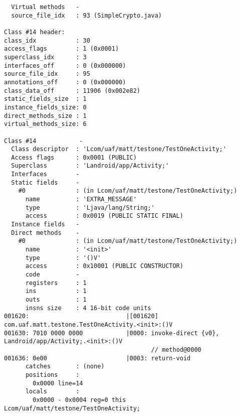\begin{lstlisting}
  Virtual methods   -
  source_file_idx   : 93 (SimpleCrypto.java)

Class #14 header:
class_idx           : 30
access_flags        : 1 (0x0001)
superclass_idx      : 3
interfaces_off      : 0 (0x000000)
source_file_idx     : 95
annotations_off     : 0 (0x000000)
class_data_off      : 11906 (0x002e82)
static_fields_size  : 1
instance_fields_size: 0
direct_methods_size : 1
virtual_methods_size: 6

Class #14            -
  Class descriptor  : 'Lcom/uaf/matt/testone/TestOneActivity;'
  Access flags      : 0x0001 (PUBLIC)
  Superclass        : 'Landroid/app/Activity;'
  Interfaces        -
  Static fields     -
    #0              : (in Lcom/uaf/matt/testone/TestOneActivity;)
      name          : 'EXTRA_MESSAGE'
      type          : 'Ljava/lang/String;'
      access        : 0x0019 (PUBLIC STATIC FINAL)
  Instance fields   -
  Direct methods    -
    #0              : (in Lcom/uaf/matt/testone/TestOneActivity;)
      name          : '<init>'
      type          : '()V'
      access        : 0x10001 (PUBLIC CONSTRUCTOR)
      code          -
      registers     : 1
      ins           : 1
      outs          : 1
      insns size    : 4 16-bit code units
001620:                           |[001620] com.uaf.matt.testone.TestOneActivity.<init>:()V
001630: 7010 0000 0000            |0000: invoke-direct {v0}, Landroid/app/Activity;.<init>:()V
                                         // method@0000
001636: 0e00                      |0003: return-void
      catches       : (none)
      positions     :
        0x0000 line=14
      locals        :
        0x0000 - 0x0004 reg=0 this Lcom/uaf/matt/testone/TestOneActivity;


\end{lstlisting}
